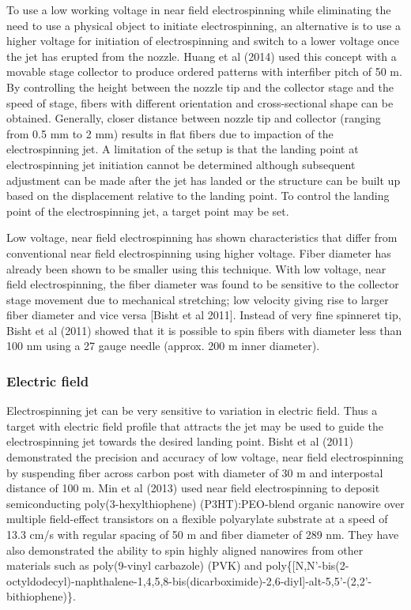 \documentclass[3p,,preprint,12pt]{elsarticle}
\begin{document}
To use a low working voltage in near field electrospinning while eliminating the need to use a physical object to initiate electrospinning, an alternative is to use a higher voltage for initiation of electrospinning and switch to a lower voltage once the jet has erupted from the nozzle. Huang et al (2014) used this concept with a movable stage collector to produce ordered patterns with interfiber pitch of 50 \textmu m. By controlling the height between the nozzle tip and the collector stage and the speed of stage, fibers with different orientation and cross-sectional shape can be obtained. Generally, closer distance between nozzle tip and collector (ranging from 0.5 mm to 2 mm) results in flat fibers due to impaction of the electrospinning jet. A limitation of the setup is that the landing point at electrospinning jet initiation cannot be determined although subsequent adjustment can be made after the jet has landed or the structure can be built up based on the displacement relative to the landing point. To control the landing point of the electrospinning jet, a target point may be set.

Low voltage, near field electrospinning has shown characteristics that differ from conventional near field electrospinning using higher voltage. Fiber diameter has already been shown to be smaller using this technique. With low voltage, near field electrospinning, the fiber diameter was found to be sensitive to the collector stage movement due to mechanical stretching; low velocity giving rise to larger fiber diameter and vice versa [Bisht et al 2011]. Instead of very fine spinneret tip, Bisht et al (2011) showed that it is possible to spin fibers with diameter less than 100 nm using a 27 gauge needle (approx. 200 \textmu m inner diameter).



\subsubsection{Electric field}Electrospinning jet can be very sensitive to variation in electric field. Thus a target with electric field profile that attracts the jet may be used to guide the electrospinning jet towards the desired landing point. Bisht et al (2011) demonstrated the precision and accuracy of low voltage, near field electrospinning by suspending fiber across carbon post with diameter of 30 \textmu m and interpostal distance of 100 \textmu m. Min et al (2013) used near field electrospinning to deposit semiconducting poly(3-hexylthiophene) (P3HT):PEO-blend organic nanowire over multiple field-effect transistors on a flexible polyarylate substrate at a speed of 13.3 cm/s with regular spacing of 50 \textmu m and fiber diameter of 289 nm. They have also demonstrated the ability to spin highly aligned nanowires from other materials such as poly(9-vinyl carbazole) (PVK) and poly\{[N,N'-bis(2-octyldodecyl)-naphthalene-1,4,5,8-bis(dicarboximide)-2,6-diyl]-alt-5,5'-(2,2'-bithiophene)\}.
\end{document}
